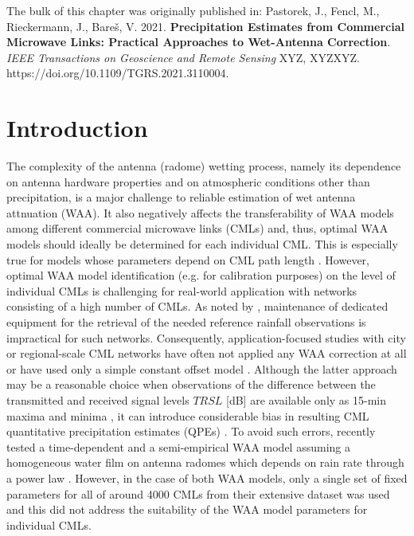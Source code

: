 \documentclass{ctuthesis}\usepackage[]{graphicx}\usepackage[]{color}
\begin{document}
{\footnotesize The bulk of this chapter was originally published in: \newline
\-\hspace{0.5cm}
Pastorek, J., Fencl, M., Rieckermann, J., Bareš, V. 2021. \textbf{Precipitation Estimates from Commercial Microwave Links: Practical Approaches to Wet-Antenna Correction}. \emph{IEEE Transactions on Geoscience and Remote Sensing} XYZ, XYZXYZ. \newline https://doi.org/10.1109/TGRS.2021.3110004.
}

\section{Introduction}

The complexity of the antenna (radome) wetting process, namely its dependence on antenna hardware properties \citep[e.g. coating;][]{lethMeasurementCampaignAssess2018} and on atmospheric conditions other than precipitation, is a major challenge to reliable estimation of wet antenna attnuation (WAA). It also negatively affects the transferability of WAA models among different commercial microwave links (CMLs) and, thus, optimal WAA models should ideally be determined for each individual CML. This is especially true for models whose parameters depend on CML path length \citep[e.g.][]{kharadlyEffectWetAntenna2001}. However, optimal WAA model identification (e.g. for calibration purposes) on the level of individual CMLs is challenging for real-world application with networks consisting of a high number of CMLs. As noted by \citep{ostrometzkyWetAntennaEffectFactor2018}, maintenance of dedicated equipment for the retrieval of the needed reference rainfall observations is impractical for such networks. Consequently, application-focused studies with city or regional-scale CML networks have often not applied any WAA correction at all \citep{chwalaPrecipitationObservationUsing2012, smiatekPotentialCommercialMicrowave2017} or have used only a simple constant offset model \citep{pastorekCommercialMicrowaveLinks2019, overeemMeasuringUrbanRainfall2011, roversiCommercialMicrowaveLinks2020, fenclAtmosphericObservationsEband2020}. Although the latter approach may be a reasonable choice when observations of the difference between the transmitted and received signal levels $T\!R\!S\!L$ [dB] are available only as 15-min maxima and minima  \citep{chwalaCommercialMicrowaveLink2019}, it can introduce considerable bias in resulting CML quantitative precipitation estimates (QPEs) \citep{pastorekCommercialMicrowaveLinks2019, fenclQuantifyingWetAntenna2019}. To avoid such errors, \cite{grafRainfallEstimationGermanwide2020} recently tested a time-dependent \citep{schleissQuantificationModelingWetAntenna2013} and a semi-empirical WAA model assuming a homogeneous water film on antenna radomes which depends on rain rate through a power law \citep{leijnseMicrowaveLinkRainfall2008}. However, in the case of both WAA models, only a single set of fixed parameters for all of around 4000 CMLs from their extensive dataset was used and this did not address the suitability of the WAA model parameters for individual CMLs.
\end{document}
